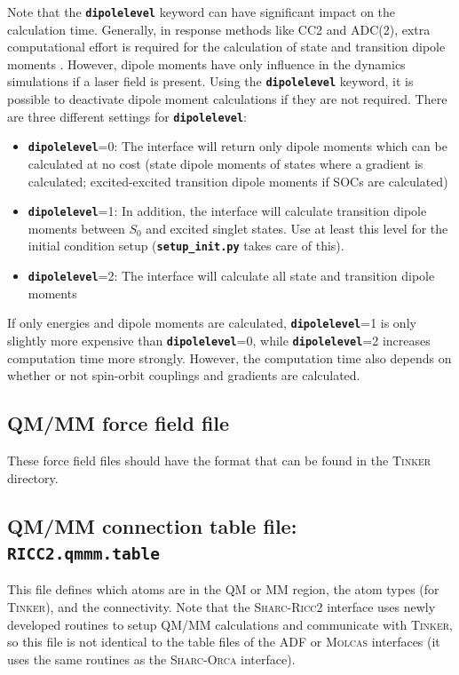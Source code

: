 \documentclass[a4paper,10pt,DIV=15,openany]{scrbook}
\newcommand{\sharc}{\textsc{Sharc}}
\newcommand{\ttt}[1]{\textbf{\texttt{#1}}}
\begin{document}
Note that the \ttt{dipolelevel} keyword can have significant impact on the calculation time.
Generally, in response methods like CC2 and ADC(2), extra computational effort is required for the calculation of state and transition dipole moments .
However, dipole moments have only influence in the dynamics simulations if a laser field is present.
Using the \ttt{dipolelevel} keyword, it is possible to deactivate dipole moment calculations if they are not required.
There are three different settings for \ttt{dipolelevel}: 
\begin{itemize}
  \item \ttt{dipolelevel}=0: The interface will return only dipole moments which can be calculated at no cost (state dipole moments of states where a gradient is calculated; excited-excited transition dipole moments if SOCs are calculated)
  \item \ttt{dipolelevel}=1: In addition, the interface will calculate transition dipole moments between $S_0$ and excited singlet states. Use at least this level for the initial condition setup (\ttt{setup\_init.py} takes care of this).
  \item \ttt{dipolelevel}=2: The interface will calculate all state and transition dipole moments
\end{itemize}
If only energies and dipole moments are calculated, \ttt{dipolelevel}=1 is only slightly more expensive than \ttt{dipolelevel}=0, while \ttt{dipolelevel}=2 increases computation time more strongly.
However, the computation time also depends on whether or not spin-orbit couplings and gradients are calculated. 





\subsection{QM/MM force field file}

These force field files should have the format that can be found in the \textsc{Tinker} directory.



\subsection{QM/MM connection table file: \ttt{RICC2.qmmm.table}}

This file defines which atoms are in the QM or MM region, the atom types (for \textsc{Tinker}), and the connectivity.
Note that the \sharc-\textsc{Ricc2} interface uses newly developed routines to setup QM/MM calculations and communicate with \textsc{Tinker}, so this file is not identical to the table files of the ADF or \textsc{Molcas} interfaces (it uses the same routines as the \sharc-\textsc{Orca} interface).
\end{document}
